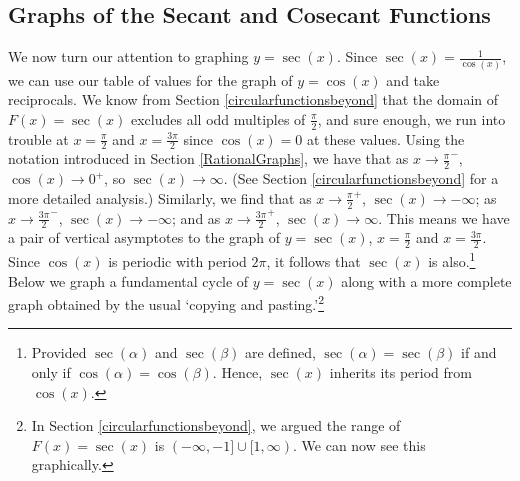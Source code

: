 \subsection{Graphs of the Secant and Cosecant Functions}
\label{secantcosecantgraphsection}

We now turn our attention to graphing $y = \sec(x)$.  Since $\sec(x) = \frac{1}{\cos(x)}$, we can use our table of values for the graph of $y = \cos(x)$ and take reciprocals. We know from Section \ref{circularfunctionsbeyond} that the domain of $F(x) = \sec(x)$ excludes all odd multiples of $\frac{\pi}{2}$, and sure enough, we run into trouble at $x = \frac{\pi}{2}$ and $x = \frac{3\pi}{2}$ since $\cos(x) = 0$ at these values.  Using the notation introduced in Section \ref{RationalGraphs}, we have that as $x \rightarrow \frac{\pi}{2}^{-}$, $\cos(x) \rightarrow 0^{+}$, so $\sec(x) \rightarrow \infty$. (See Section \ref{circularfunctionsbeyond} for a more detailed analysis.) Similarly, we find that  as $x \rightarrow \frac{\pi}{2}^{+}$, $\sec(x) \rightarrow -\infty$;  as $x \rightarrow \frac{3\pi}{2}^{-}$, $\sec(x) \rightarrow -\infty$; and as $x \rightarrow \frac{3\pi}{2}^{+}$, $\sec(x) \rightarrow \infty$.  This means we have a pair of vertical asymptotes to the graph of $y = \sec(x)$, $x = \frac{\pi}{2}$ and $x = \frac{3\pi}{2}$.  Since $\cos(x)$ is periodic with period $2\pi$, it follows that $\sec(x)$ is also.\footnote{Provided $\sec(\alpha)$ and  $\sec(\beta)$ are defined, $\sec(\alpha) = \sec(\beta)$ if and only if $\cos(\alpha) = \cos(\beta)$.  Hence, $\sec(x)$ inherits its period from $\cos(x)$.}  Below we graph a fundamental cycle of $y = \sec(x)$  along with a more complete graph obtained by the usual `copying and pasting.'\footnote{In Section \ref{circularfunctionsbeyond}, we argued the range of $F(x) = \sec(x)$ is $(-\infty, -1] \cup [1,\infty)$.  We can now see this graphically.}

